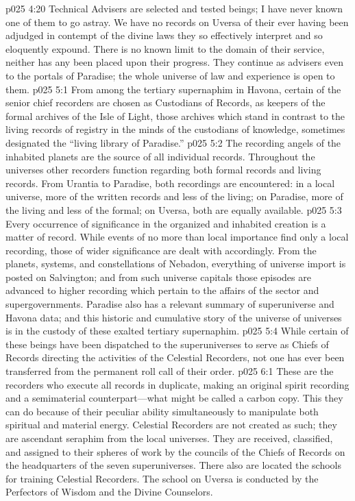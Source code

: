 \vs p025 4:20 Technical Advisers are selected and tested beings; I have never known one of them to go astray. We have no records on Uversa of their ever having been adjudged in contempt of the divine laws they so effectively interpret and so eloquently expound. There is no known limit to the domain of their service, neither has any been placed upon their progress. They continue as advisers even to the portals of Paradise; the whole universe of law and experience is open to them.
\vs p025 5:1 From among the tertiary supernaphim in Havona, certain of the senior chief recorders are chosen as Custodians of Records, as keepers of the formal archives of the Isle of Light, those archives which stand in contrast to the living records of registry in the minds of the custodians of knowledge, sometimes designated the “living library of Paradise.”
\vs p025 5:2 The recording angels of the inhabited planets are the source of all individual records. Throughout the universes other recorders function regarding both formal records and living records. From Urantia to Paradise, both recordings are encountered: in a local universe, more of the written records and less of the living; on Paradise, more of the living and less of the formal; on Uversa, both are equally available.
\vs p025 5:3 Every occurrence of significance in the organized and inhabited creation is a matter of record. While events of no more than local importance find only a local recording, those of wider significance are dealt with accordingly. From the planets, systems, and constellations of Nebadon, everything of universe import is posted on Salvington; and from such universe capitals those episodes are advanced to higher recording which pertain to the affairs of the sector and supergovernments. Paradise also has a relevant summary of superuniverse and Havona data; and this historic and cumulative story of the universe of universes is in the custody of these exalted tertiary supernaphim.
\vs p025 5:4 While certain of these beings have been dispatched to the superuniverses to serve as Chiefs of Records directing the activities of the Celestial Recorders, not one has ever been transferred from the permanent roll call of their order.
\vs p025 6:1 These are the recorders who execute all records in duplicate, making an original spirit recording and a semimaterial counterpart---what might be called a carbon copy. This they can do because of their peculiar ability simultaneously to manipulate both spiritual and material energy. Celestial Recorders are not created as such; they are ascendant seraphim from the local universes. They are received, classified, and assigned to their spheres of work by the councils of the Chiefs of Records on the headquarters of the seven superuniverses. There also are located the schools for training Celestial Recorders. The school on Uversa is conducted by the Perfectors of Wisdom and the Divine Counselors.\plusone
